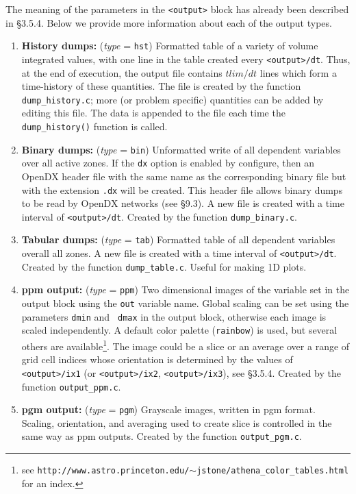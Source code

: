 The meaning of the parameters in the {\tt <output>} block has already been
described in \S 3.5.4.  Below we provide more information about each of the
output types.
\begin{enumerate}

\item {\bf History dumps:} ({\em type} = {\tt hst}) Formatted
table of a variety of volume integrated values, with one line in the
table created every {\tt <output>/dt}.  Thus, at the end of execution, the
output file contains $tlim/dt$ lines which form a time-history of these
quantities.  The file is created by the function {\tt dump\_history.c};
more (or problem specific) quantities can be added by editing this file.
The data is appended to the file each time the {\tt dump\_history()}
function is called.

\item {\bf Binary dumps:} ({\em type} = {\tt bin}) Unformatted
write of all dependent variables over all active zones.  If the {\tt dx}
option is enabled by configure, then an OpenDX header file with the same
name as the corresponding binary file but with the extension {\tt .dx}
will be created.  This header file allows binary dumps to be read by
OpenDX networks (see \S9.3).  A new file is created with a time interval
of {\tt <output>/dt}.  Created by the function {\tt dump\_binary.c}.

\item {\bf Tabular dumps:} ({\em type} = {\tt tab}) Formatted
table of all dependent variables overall all zones.  A new file is
created with a time interval of {\tt <output>/dt}.
Created by the function {\tt dump\_table.c}.  Useful for making 1D plots.

\item {\bf  ppm output:} ({\em type} = {\tt ppm}) Two dimensional images of
the variable set in the output block using the {\tt out} variable name.
Global scaling can be set using the parameters {\tt dmin} and {\tt
dmax} in the output block, otherwise each image is scaled independently.
A default color palette ({\tt rainbow}) is used, but several others are
available\footnote{see {\tt http://www.astro.princeton.edu/$\sim$jstone/athena\_color\_tables.html} for an index.}.  The image could be a
slice or an average over a range of grid cell indices whose orientation
is determined by the
values of {\tt <output>/ix1} (or {\tt <output>/ix2}, {\tt <output>/ix3}), 
see \S 3.5.4.  Created by the function
{\tt output\_ppm.c}.

\item {\bf  pgm output:} ({\em type} = {\tt pgm}) Grayscale images,
written in pgm format.  Scaling, orientation, and averaging used to
create slice is controlled in the same way as ppm outputs.
Created by the function {\tt output\_pgm.c}.


\end{enumerate}
